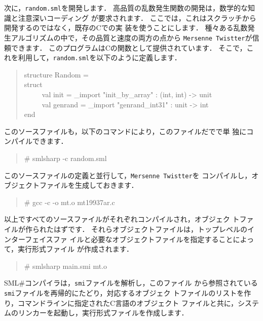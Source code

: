 \documentclass{jbook}
\newcommand{\smlsharp}{SML\#}
\newenvironment{program}{\begin{tt}\begin{quote}}{\end{quote}\end{tt}}
\newcommand{\myem}{\ \ \ \ \  }
\begin{document}
	次に，{\tt random.sml}を開発します．
	高品質の乱数発生関数の開発は，数学的な知識と注意深いコーディング
が要求されます．
	ここでは，これはスクラッチから開発するのではなく，既存のCでの実
装を使うことにします．
	種々ある乱数発生アルゴリズムの中で，その品質と速度の両方の点から
{\tt Mersenne Twistter}が信頼できます．
	このプログラムはCの関数として提供されています．
	そこで，これを利用して，{\tt random.sml}を以下のように定義します．
\begin{program}
structure Random =\\
struct\\
\myem  val init = \_import "init\_by\_array" : (int, int) -> unit\\
\myem  val genrand = \_import "genrand\_int31" : unit -> int\\
end
\end{program}
	このソースファイルも，以下のコマンドにより，このファイルだでで単
独にコンパイルできます．
\begin{program}
\# smlsharp -c random.sml
\end{program}
	このソースファイルの定義と並行して，{\tt Mersenne Twistter}を
コンパイルし，オブジェクトファイルを生成しておきます．
\begin{program}
\# gcc -c -o mt.o mt19937ar.c
\end{program}
	以上ですべてのソースファイルがそれぞれコンパイルされ，オブジェク
トファイルが作られたはずです．
	それらオブジェクトファイルは，トップレベルのインターフェイスファ
イルと必要なオブジェクトファイルを指定することによって，実行形式ファイル
が作成されます．
\begin{program}
\# smlsharp main.smi mt.o
\end{program}
	\smlsharp{}コンパイラは，{\tt smi}ファイルを解析し，このファイル
から参照されている{\tt smi}ファイルを再帰的にたどり，対応するオブジェク
トファイルのリストを作り，コマンドラインに指定されたC言語のオブジェクト
ファイルと共に，システムのリンカーを起動し，実行形式ファイルを作成します．
	
\end{document}
